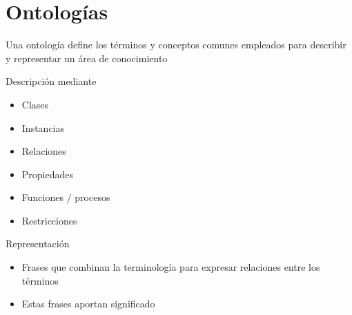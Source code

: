 \chapter{Ontologías}
Una ontología define los términos y conceptos comunes
empleados para describir y representar un área de
conocimiento   

Descripción mediante
\begin{itemize}
	\item Clases
	\item Instancias
	\item Relaciones
	\item Propiedades
	\item Funciones / procesos
	\item Restricciones
\end{itemize}
Representación
\begin{itemize}
	\item Frases que combinan la
terminología para expresar
relaciones entre los términos
	\item Estas frases aportan
significado
\end{itemize}
